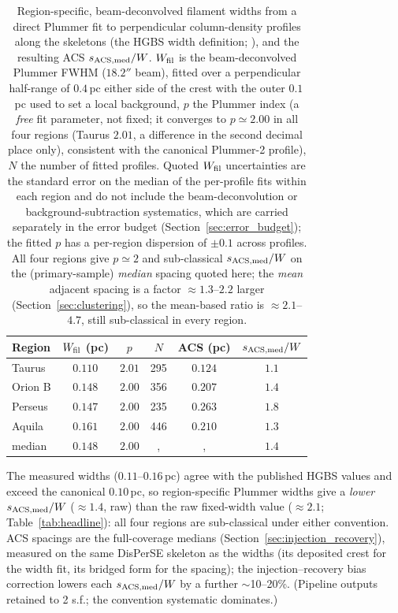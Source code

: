 \documentclass[usenatbib,twoside,twocolumn]{mnras}
\begin{document}
\begin{table}
\caption{Region-specific, beam-deconvolved filament widths from a direct Plummer fit to perpendicular column-density profiles along the skeletons (the HGBS width definition; \citealt{Arzoumanian2019}), and the resulting ACS $s_{\rm ACS,med}/W$. $W_{\rm fil}$ is the beam-deconvolved Plummer FWHM ($18.2''$ beam), fitted over a perpendicular half-range of $0.4$\,pc either side of the crest with the outer $0.1$\,pc used to set a local background, $p$ the Plummer index (a \emph{free} fit parameter, not fixed; it converges to $p\simeq2.00$ in all four regions (Taurus $2.01$, a difference in the second decimal place only), consistent with the canonical Plummer-2 profile), $N$ the number of fitted profiles. Quoted $W_{\rm fil}$ uncertainties are the standard error on the median of the per-profile fits within each region and do not include the beam-deconvolution or background-subtraction systematics, which are carried separately in the error budget (Section~\ref{sec:error_budget}); the fitted $p$ has a per-region dispersion of $\pm0.1$ across profiles. All four regions give $p\simeq2$ and sub-classical $s_{\rm ACS,med}/W$ on the (primary-sample) \emph{median} spacing quoted here; the \emph{mean} adjacent spacing is a factor $\approx1.3$--$2.2$ larger (Section~\ref{sec:clustering}), so the mean-based ratio is $\approx2.1$--$4.7$, still sub-classical in every region.}
\label{tab:widths}
\footnotesize
\setlength{\tabcolsep}{3pt}
\begin{tabular}{p{1.7cm}ccccc}
\toprule
Region & $W_{\rm fil}$ (pc) & $p$ & $N$ & ACS (pc) & $s_{\rm ACS,med}/W$ \\
\midrule
Taurus  & $0.110$ & $2.01$ & 295 & $0.124$ & $1.1$ \\
Orion B & $0.148$ & $2.00$ & 356 & $0.207$ & $1.4$ \\
Perseus & $0.147$ & $2.00$ & 235 & $0.263$ & $1.8$ \\
Aquila  & $0.161$ & $2.00$ & 446 & $0.210$ & $1.3$ \\
\midrule
median  & $0.148$ & $2.00$ &, &, & $1.4$ \\
\bottomrule
\end{tabular}
\par\vspace{2pt}
\footnotesize The measured widths ($0.11$--$0.16$\,pc) agree with the published HGBS values and exceed the canonical $0.10$\,pc, so region-specific Plummer widths give a \emph{lower} $s_{\rm ACS,med}/W$ ($\approx1.4$, raw) than the raw fixed-width value ($\approx2.1$; Table~\ref{tab:headline}): all four regions are sub-classical under either convention. ACS spacings are the full-coverage medians (Section~\ref{sec:injection_recovery}), measured on the same DisPerSE skeleton as the widths (its deposited crest for the width fit, its bridged form for the spacing); the injection--recovery bias correction lowers each $s_{\rm ACS,med}/W$ by a further $\sim$10--20\%. (Pipeline outputs retained to 2 s.f.; the convention systematic dominates.)
\end{table}
\end{document}

